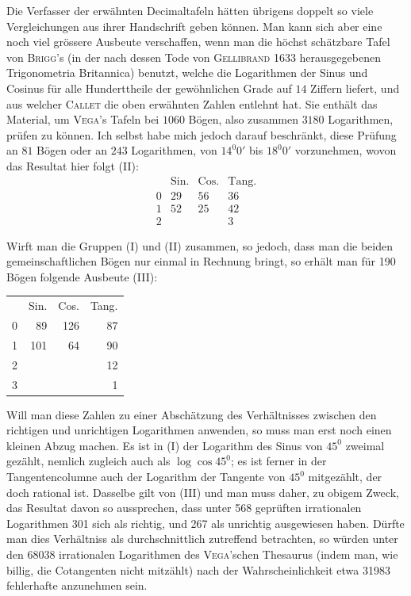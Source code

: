 Die Verfasser der erwähnten Decimaltafeln hätten übrigens doppelt so viele
Vergleichungen aus ihrer Handschrift geben können. Man kann sich aber eine
noch viel grössere Ausbeute verschaffen, wenn man die höchst schätzbare Tafel
von \textsc{Brigg}'s (in der nach dessen Tode von \textsc{Gellibrand} 1633 herausgegebenen Trigonometria Britannica) benutzt, welche die Logarithmen der Sinus und Cosinus
für alle Hunderttheile der gewöhnlichen Grade auf \(14\) Ziffern liefert, und aus
welcher \textsc{Callet} die oben erwähnten Zahlen entlehnt hat. Sie enthält das Material, um \textsc{Vega}'s Tafeln bei \(1060\) Bögen, also zusammen \(3180\) Logarithmen, prüfen zu können. Ich selbst habe mich jedoch darauf beschränkt, diese Prüfung
an \(81\) Bögen oder an \(243\) Logarithmen, von \(14^{0}0'\) bis \(18^{0}0'\) vorzunehmen, wovon
das Resultat hier folgt (II):
\[
\begin{array}{rccc}
 & \mathrm{Sin.} & \mathrm{Cos.} & \mathrm{Tang.} \\
0 & 29 & 56 & 36 \\
1 & 52 & 25 & 42 \\
2 &    &    & 3
\end{array}
\]
\par
{}
Wirft man die Gruppen (I) und (II) zusammen, so jedoch, dass man die
beiden gemeinschaftlichen Bögen nur einmal in Rechnung bringt, so erhält man
für 190 Bögen folgende Ausbeute (III):
\begin{center}
\begin{tabular}{rrrr}
 & Sin. & Cos. & Tang. \\
0 & 89 & 126 & 87 \\
1 & 101 & 64 & 90 \\
2 & & & 12 \\
3 & & & 1
\end{tabular}
\end{center}
Will man diese Zahlen zu einer Abschätzung des Verhältnisses zwischen den
richtigen und unrichtigen Logarithmen anwenden, so muss man erst noch einen
kleinen Abzug machen. Es ist in (I) der Logarithm des Sinus von $45^{0}$ zweimal
gezählt, nemlich zugleich auch als $\log\cos45^{0}$; es ist ferner in der Tangentencolumne auch der Logarithm der Tangente von $45^{0}$ mitgezählt, der doch rational
ist. Dasselbe gilt von (III) und man muss daher, zu obigem Zweck, das Resultat davon so aussprechen, dass unter 568 geprüften irrationalen Logarithmen 301
sich als richtig, und 267 als unrichtig ausgewiesen haben. Dürfte man dies Verhältniss als durchschnittlich zutreffend betrachten, so würden unter den 68038
irrationalen Logarithmen des \textsc{Vega}'schen Thesaurus (indem man, wie billig, die
Cotangenten nicht mitzählt) nach der Wahrscheinlichkeit etwa 31983 fehlerhafte
anzunehmen sein.

